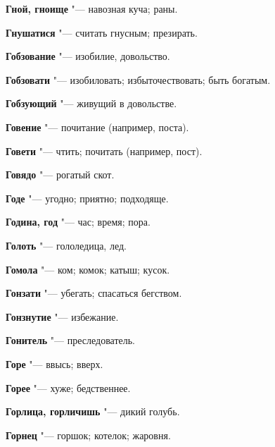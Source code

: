 \begin{mymulticols}{2}
\noindent\textbf{Гной, гноище} "--- навозная куча; раны. 




\noindent\textbf{Гнушатися} "--- считать гнусным; презирать. 




\noindent\textbf{Гобзование} "--- изобилие, довольство. 




\noindent\textbf{Гобзовати} "--- изобиловать; избыточествовать; быть богатым. 




\noindent\textbf{Гобзующий} "--- живущий в довольстве. 




\noindent\textbf{Говение} "--- почитание (например, поста). 




\noindent\textbf{Говети} "--- чтить; почитать (например, пост). 




\noindent\textbf{Говядо} "--- рогатый скот. 




\noindent\textbf{Годе} "--- угодно; приятно; подходяще. 




\noindent\textbf{Година, год} "--- час; время; пора. 




\noindent\textbf{Голоть} "--- гололедица, лед. 




\noindent\textbf{Гомола} "--- ком; комок; катыш; кусок. 




\noindent\textbf{Гонзати} "--- убегать; спасаться бегством. 




\noindent\textbf{Гонзнутие} "--- избежание. 




\noindent\textbf{Гонитель} "--- преследователь. 




\noindent\textbf{Горе} "--- ввысь; вверх. 




\noindent\textbf{Горее} "--- хуже; бедственнее. 




\noindent\textbf{Горлица, горличишь} "--- дикий голубь. 




\noindent\textbf{Горнец} "--- горшок; котелок; жаровня. 





\end{mymulticols}
